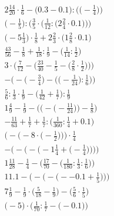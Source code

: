 \documentclass[8pt]{article}
\begin{document}
\begin{align}
2\frac{14}{20} \cdot \frac{1}{6} - \Big(0.3 - 0.1\Big) : \Big(\big(-\frac{1}{4}\big)\Big) \\
\bigg(-\frac{1}{5}\bigg) : \bigg(\frac{3}{5} \cdot \Big(\frac{1}{12} : \big(2\frac{2}{4} \cdot 0.1\big)\Big)\bigg) \\
\big(-5\frac{1}{3}\big) \cdot \frac{1}{8} + 2\frac{2}{3} \cdot \big(1\frac{2}{8} \cdot 0.1\big) \\
\frac{43}{56} - \frac{1}{8} + \frac{1}{18} : \frac{1}{9} - \big(\frac{1}{14} : \frac{1}{2}\big) \\
3 \cdot \bigg(\frac{7}{12} - \Big(\frac{23}{40} - \frac{1}{5} - \big(\frac{2}{8} \cdot \frac{1}{2}\big)\Big)\bigg) \\
-\bigg(-\Big(-\frac{3}{4}\Big) - \Big(\big(-\frac{1}{24}\big) : \frac{1}{6}\Big)\bigg) \\
\frac{5}{6} : \frac{1}{3} \cdot \frac{1}{9} - \big(\frac{1}{42} + \frac{1}{7}\big) : \frac{1}{9} \\
1\frac{4}{9} - \frac{1}{9} - \bigg(\Big(-\big(-\frac{11}{24}\big)\Big) - \frac{1}{8}\bigg) \\
-\frac{11}{63} + \frac{1}{7} + \frac{1}{7} : \big(\frac{1}{360} : \frac{1}{4} + 0.1\big) \\
\bigg(-\Big(-8 \cdot \big(-\frac{1}{2}\big)\Big)\bigg) \cdot \frac{1}{4} \\
-\Bigg(-\bigg(-\Big(-1\frac{1}{4} + \big(-\frac{1}{4}\big)\Big)\bigg)\Bigg) \\
1\frac{11}{28} - \frac{1}{4} - \Big(\frac{17}{70} - \big(\frac{1}{180} : \frac{1}{3} : \frac{1}{6}\big)\Big) \\
11.1 - \bigg(-\Big(-\big(--0.1 + \frac{1}{5}\big)\Big)\bigg) \\
7\frac{1}{9} - \frac{1}{9} \cdot \big(\frac{5}{18} - \frac{1}{9}\big) - \big(\frac{5}{6} \cdot \frac{1}{5}\big) \\
\Big(-5\Big) \cdot \Big(\frac{1}{70} : \frac{1}{7} - \big(-0.1\big)\Big)
\end{align}
\end{document}
